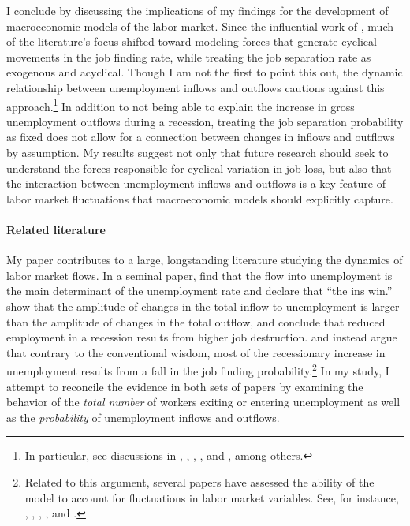 \documentclass[12pt]{article}
\begin{document}
I conclude by discussing the implications of my findings for the development of macroeconomic models of the labor market. Since the influential work of \cite{Shimer:2005aa,Shimer:2012aa}, much of the literature's focus shifted toward modeling forces that generate cyclical movements in the job finding rate, while treating the job separation rate as exogenous and acyclical. Though I am not the first to point this out, the dynamic relationship between unemployment inflows and outflows cautions against this approach.\footnote{In particular, see discussions in \cite{Elsby:2009aa}, \cite{Fujita:2009aa}, \cite{Fujita:2011aa}, \cite{Fujita:2012aa}, and \cite{Mercan:2024aa}, among others.} In addition to not being able to explain the increase in gross unemployment outflows during a recession, treating the job separation probability as fixed does not allow for a connection between changes in inflows and outflows by assumption. My results suggest not only that future research should seek to understand the forces responsible for cyclical variation in job loss, but also that the interaction between unemployment inflows and outflows is a key feature of labor market fluctuations that macroeconomic models should explicitly capture. 

\paragraph{Related literature} My paper contributes to a large, longstanding literature studying the dynamics of labor market flows. In a seminal paper, \cite{Darby:1986aa} find that the flow into unemployment is the main determinant of the unemployment rate and declare that ``the ins win.'' \cite{Blanchard:1990aa} show that the amplitude of changes in the total inflow to unemployment is larger than the amplitude of changes in the total outflow, and conclude that reduced employment in a recession results from higher job destruction. \cite{Hall:2005aa} and \cite{Shimer:2012aa} instead argue that contrary to the conventional wisdom, most of the recessionary increase in unemployment results from a fall in the job finding probability.\footnote{Related to this argument, several papers have assessed the ability of the \cite{Mortensen:1994aa} model to account for fluctuations in labor market variables. See, for instance, \cite{Mortensen:2007aa}, \cite{Mortensen:2008aa}, \cite{Pissarides:2009aa}, \cite{Fujita:2012aa}, and \cite{Tortorice:2013aa}.} In my study, I attempt to reconcile the evidence in both sets of papers by examining the behavior of the \textit{total number} of workers exiting or entering unemployment as well as the \textit{probability} of unemployment inflows and outflows.
\end{document}
